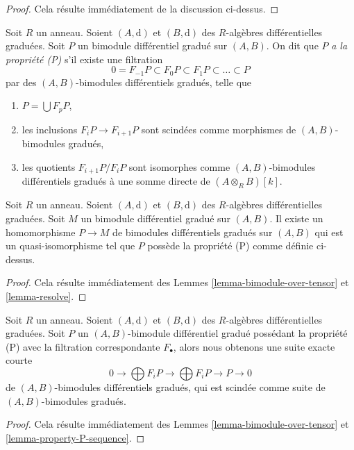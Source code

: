\begin{proof}
Cela résulte immédiatement de la discussion ci-dessus.
\end{proof}

\noindent
Soit $R$ un anneau. Soient $(A, \text{d})$ et $(B, \text{d})$ des $R$-algèbres
différentielles graduées. Soit $P$ un bimodule différentiel gradué sur $(A, B)$.
On dit que $P$ {\it a la propriété (P)} s'il existe une filtration
$$
0 = F_{-1}P \subset F_0P \subset F_1P \subset \ldots \subset P
$$
par des $(A, B)$-bimodules différentiels gradués, telle que
\begin{enumerate}
\item $P = \bigcup F_pP$,
\item les inclusions $F_iP \to F_{i + 1}P$ sont scindées comme morphismes
de $(A, B)$-bimodules gradués,
\item les quotients $F_{i + 1}P/F_iP$ sont isomorphes comme
$(A, B)$-bimodules différentiels gradués à une somme directe de $(A \otimes_R B)[k]$.
\end{enumerate}

\begin{lemma}
\label{lemma-bimodule-resolve}
Soit $R$ un anneau. Soient $(A, \text{d})$ et $(B, \text{d})$ des $R$-algèbres
différentielles graduées. Soit $M$ un bimodule différentiel gradué sur $(A, B)$.
Il existe un homomorphisme $P \to M$ de bimodules différentiels gradués sur $(A,
B)$ qui est un quasi-isomorphisme tel que $P$ possède la propriété (P) comme
définie ci-dessus.
\end{lemma}

\begin{proof}
Cela résulte immédiatement des Lemmes \ref{lemma-bimodule-over-tensor} et
\ref{lemma-resolve}.
\end{proof}

\begin{lemma}
\label{lemma-bimodule-property-P-sequence}
Soit $R$ un anneau. Soient $(A, \text{d})$ et $(B, \text{d})$ des $R$-algèbres
différentielles graduées. Soit $P$ un $(A, B)$-bimodule différentiel gradué
possédant la propriété (P) avec la filtration correspondante $F_\bullet$, alors
nous obtenons une suite exacte courte
$$
0 \to
\bigoplus\nolimits F_iP \to
\bigoplus\nolimits F_iP \to P \to 0
$$
de $(A, B)$-bimodules différentiels gradués, qui est scindée comme suite de
$(A, B)$-bimodules gradués.
\end{lemma}

\begin{proof}
Cela résulte immédiatement des Lemmes \ref{lemma-bimodule-over-tensor} et
\ref{lemma-property-P-sequence}.
\end{proof}















